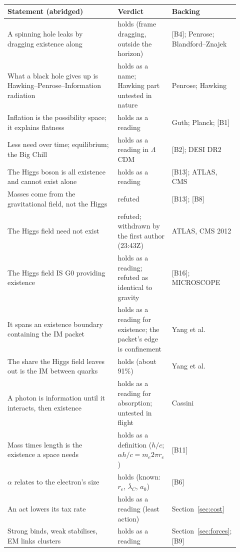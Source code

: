 \documentclass[11pt,a4paper]{article}
\theoremstyle{definition}
\newcommand{\chk}[1]{\textsf{[#1]}}
\begin{document}
\begin{center}\small
\begin{longtable}{@{}p{0.47\linewidth}p{0.22\linewidth}p{0.23\linewidth}@{}}
\toprule
Statement (abridged) & Verdict & Backing \\
\midrule
\endhead
A spinning hole leaks by dragging existence along & holds (frame dragging, outside the horizon) & \chk{B4}; Penrose; Blandford--Znajek \\
What a black hole gives up is Hawking--Penrose--Information radiation & holds as a name; Hawking part untested in nature & Penrose; Hawking \\
Inflation is the possibility space; it explains flatness & holds as a reading & Guth; Planck; \chk{B1} \\
Less need over time; equilibrium; the Big Chill & holds as a reading in $\Lambda$CDM & \chk{B2}; DESI DR2 \\
The Higgs boson is all existence and cannot exist alone & holds as a reading & \chk{B13}; ATLAS, CMS \\
Masses come from the gravitational field, not the Higgs & refuted & \chk{B13}; \chk{B8} \\
The Higgs field need not exist & refuted; withdrawn by the first author (23:43Z) & ATLAS, CMS 2012 \\
The Higgs field IS G0 providing existence & holds as a reading; refuted as identical to gravity & \chk{B16}; MICROSCOPE \\
It spans an existence boundary containing the IM packet & holds as a reading for existence; the packet's edge is confinement & Yang et al. \\
The share the Higgs field leaves out is the IM between quarks & holds (about 91\%) & Yang et al. \\
A photon is information until it interacts, then existence & holds as a reading for absorption; untested in flight & Cassini \\
Mass times length is the existence a space needs & holds as a definition ($h/c$; $\alpha h/c=m_e 2\pi r_e$) & \chk{B11} \\
$\alpha$ relates to the electron's size & holds (known: $r_e$, $\bar\lambda_C$, $a_0$) & \chk{B6} \\
An act lowers its tax rate & holds as a reading (least action) & Section~\ref{sec:cost} \\
Strong binds, weak stabilises, EM links clusters & holds as a reading & Section~\ref{sec:forces}; \chk{B9} \\

\end{longtable}
\end{center}
\end{document}
